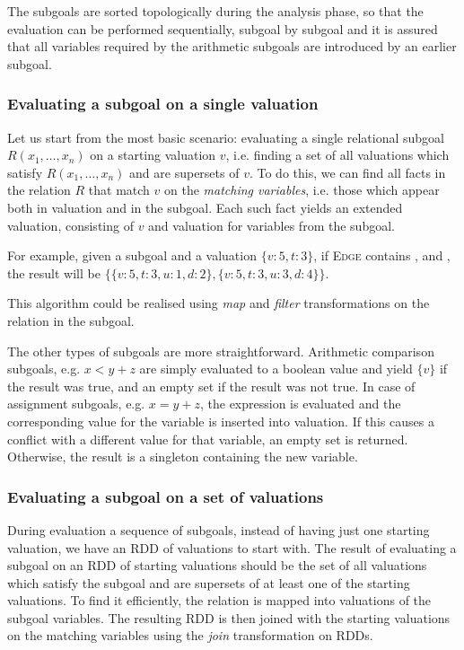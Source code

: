 The subgoals are sorted topologically during the analysis phase, so that the evaluation can be performed sequentially, subgoal by subgoal and it is assured that all variables required by the arithmetic subgoals are introduced by an earlier subgoal.

\subsubsection{Evaluating a subgoal on a single valuation}
Let us start from the most basic scenario: evaluating a single relational subgoal $R(x_1, \dots, x_n)$ on a starting valuation $v$, i.e. finding a set of all valuations which satisfy $R(x_1, \dots, x_n)$ and are supersets of $v$. To do this, we can find all facts in the relation $R$ that match $v$ on the \emph{matching variables}, i.e. those which appear both in valuation and in the subgoal. Each such fact yields an extended valuation, consisting of $v$ and valuation for variables from the subgoal.

For example, given a subgoal  and a valuation $\{v: 5, t: 3\}$, if \textsc{Edge}  contains ,  and , the result will be $\{\{v: 5, t: 3, u: 1, d: 2\}, \{v: 5, t: 3, u: 3, d: 4\}\}$.

This algorithm could be realised using \emph{map} and \emph{filter} transformations on the relation in the subgoal.

The other types of subgoals are more straightforward. Arithmetic comparison subgoals, e.g. $x < y + z$ are simply evaluated to a boolean value and yield $\{v\}$ if the result was true, and an empty set if the result was not true. In case of assignment subgoals, e.g. $x = y + z$, the expression is evaluated and the corresponding value for the variable is inserted into valuation. If this causes a conflict with a different value for that variable, an empty set is returned. Otherwise, the result is a singleton containing the new variable.

\subsubsection{Evaluating a subgoal on a set of valuations}
During evaluation a sequence of subgoals, instead of having just one starting valuation, we have an RDD of valuations to start with. The result of evaluating a subgoal on an RDD of starting valuations should be the set of all valuations which satisfy the subgoal and are supersets of at least one of the starting valuations. To find it efficiently, the relation is mapped into valuations of the subgoal variables. The resulting RDD is then joined with the starting valuations on the matching variables using the \emph{join} transformation on RDDs.

